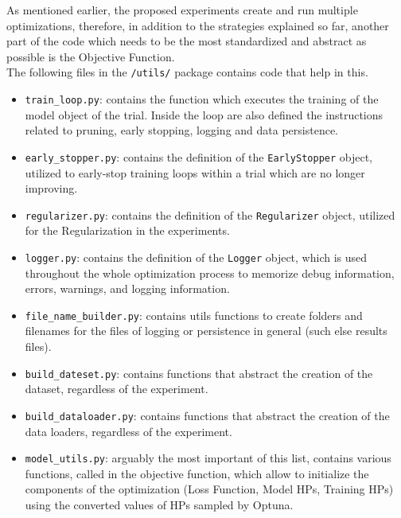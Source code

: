 As mentioned earlier, the proposed experiments create and run multiple optimizations, therefore, in addition to the strategies explained so far, another part of the code which needs to be the most standardized and abstract as possible is the Objective Function.
\\[0.3cm]The following files in the \texttt{/utils/} package contains code that help in this.
\begin{itemize}[itemsep=0.1cm]
    \item \texttt{train\_loop.py}: contains the function which executes the training of the model object of the trial. Inside the loop are also defined the instructions related to pruning, early stopping, logging and data persistence.
    \item \texttt{early\_stopper.py}: contains the definition of the \texttt{EarlyStopper} object, utilized to early-stop training loops within a trial which are no longer improving.
    \item \texttt{regularizer.py}: contains the definition of the \texttt{Regularizer} object, utilized for the Regularization in the experiments.
    \item \texttt{logger.py}: contains the definition of the \texttt{Logger} object, which is used throughout the whole optimization process to memorize debug information, errors, warnings, and logging information.
    \item \texttt{file\_name\_builder.py}: contains utils functions to create folders and filenames for the files of logging or persistence in general (such else results files).
    \item \texttt{build\_dateset.py}: contains functions that abstract the creation of the dataset, regardless of the experiment.
    \item \texttt{build\_dataloader.py}: contains functions that abstract the creation of the data loaders, regardless of the experiment.
    \item \texttt{model\_utils.py}: arguably the most important of this list, contains various functions, called in the objective function, which allow to initialize the components of the optimization (Loss Function, Model HPs, Training HPs) using the converted values of HPs sampled by Optuna.
\end{itemize}
% 
% 
